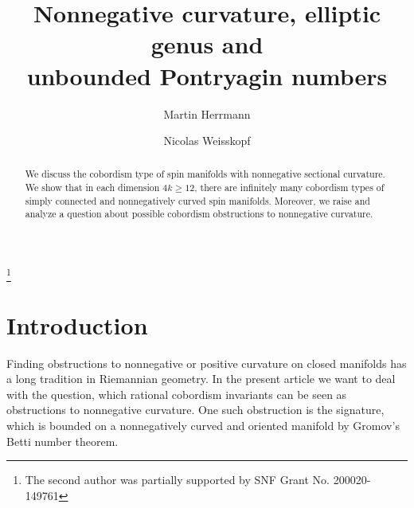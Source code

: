 \documentclass[10pt,a4paper]{amsart}
\theoremstyle{thm}
\theoremstyle{text}
\begin{document}
   

\thispagestyle{empty}
\title[Nneg. curvature, elliptic genus and unbounded Pontryagin numbers]{Nonnegative curvature, elliptic genus and\\ unbounded Pontryagin numbers}
\author{Martin Herrmann} 
\address{Martin Herrmann \\FakultÃ¤t fÃ¼r Mathematik \\Karlsruher Institut fÃ¼r Technologie \\KaiserstraÃe 89--93 \\76133 Karlsruhe, Germany}

\author{Nicolas Weisskopf}
\address{Nicolas Weisskopf 
\\DÃ©partement de mathÃ©matiques
\\UniversitÃ© de Fribourg
\\Chemin du MusÃ©e 23
\\1700 Fribourg, Switzerland}
\thanks{The second author was partially supported by SNF Grant No. 200020-149761}
\begin{abstract}
We discuss the cobordism type of spin manifolds with  nonnegative sectional curvature. We show that in each dimension $4k \geq 12$, there are infinitely many cobordism types of simply connected and nonnegatively curved spin manifolds. Moreover, we raise and analyze a question about possible cobordism obstructions to nonnegative curvature.
\end{abstract}
\maketitle
\section{Introduction}
Finding obstructions to nonnegative or positive curvature on closed mani\-folds has a long tradition in Riemannian geometry. In the present article we want to deal with the question, which rational cobordism invariants can be seen as obstructions to nonnegative curvature. One such obstruction is the signature, which is bounded on a nonnegatively curved and oriented manifold by Gromov's Betti number theorem. 
\end{document}
